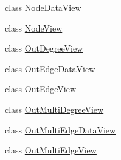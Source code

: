 \begin{DoxyCompactItemize}
\item 
class \hyperlink{classnetworkx_1_1classes_1_1reportviews_1_1NodeDataView}{Node\+Data\+View}
\item 
class \hyperlink{classnetworkx_1_1classes_1_1reportviews_1_1NodeView}{Node\+View}
\item 
class \hyperlink{classnetworkx_1_1classes_1_1reportviews_1_1OutDegreeView}{Out\+Degree\+View}
\item 
class \hyperlink{classnetworkx_1_1classes_1_1reportviews_1_1OutEdgeDataView}{Out\+Edge\+Data\+View}
\item 
class \hyperlink{classnetworkx_1_1classes_1_1reportviews_1_1OutEdgeView}{Out\+Edge\+View}
\item 
class \hyperlink{classnetworkx_1_1classes_1_1reportviews_1_1OutMultiDegreeView}{Out\+Multi\+Degree\+View}
\item 
class \hyperlink{classnetworkx_1_1classes_1_1reportviews_1_1OutMultiEdgeDataView}{Out\+Multi\+Edge\+Data\+View}
\item 
class \hyperlink{classnetworkx_1_1classes_1_1reportviews_1_1OutMultiEdgeView}{Out\+Multi\+Edge\+View}
\end{DoxyCompactItemize}



